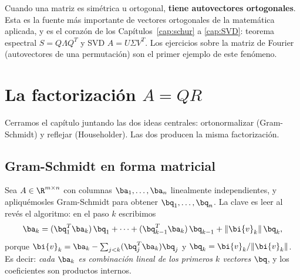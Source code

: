 \begin{observacion}
Cuando una matriz es simétrica u ortogonal, \textbf{tiene autovectores
ortogonales}. Esta es la fuente más importante de vectores ortogonales de la
matemática aplicada, y es el corazón de los Capítulos~\ref{cap:schur} a
\ref{cap:SVD}: teorema espectral $S=Q\Lambda Q^T$ y SVD $A=U\Sigma V^T$. Los ejercicios
sobre la matriz de Fourier (autovectores de una permutación) son el primer
ejemplo de este fenómeno.
\end{observacion}

\section{La factorización $A=QR$}\label{sec:QR}

Cerramos el capítulo juntando las dos ideas centrales: ortonormalizar
(Gram-Schmidt) y reflejar (Householder). Las dos producen la misma
factorización.

\subsection*{Gram-Schmidt en forma matricial}

Sea $A\in\R^{m\times n}$ con columnas $\ba_1,\dots,\ba_n$ linealmente
independientes, y apliquémosles Gram-Schmidt para obtener
$\bq_1,\dots,\bq_n$. La clave es leer al revés el algoritmo: en el paso $k$
escribimos
\[
\ba_k=(\bq_1^T\ba_k)\,\bq_1+\cdots+(\bq_{k-1}^T\ba_k)\,\bq_{k-1}
+\|\bi{v}_k\|\,\bq_k ,
\]
porque $\bi{v}_k=\ba_k-\sum_{j<k}(\bq_j^T\ba_k)\bq_j$ y
$\bq_k=\bi{v}_k/\|\bi{v}_k\|$. Es decir: \emph{cada $\ba_k$ es combinación
lineal de los primeros $k$ vectores $\bq$}, y los coeficientes son productos
internos.


